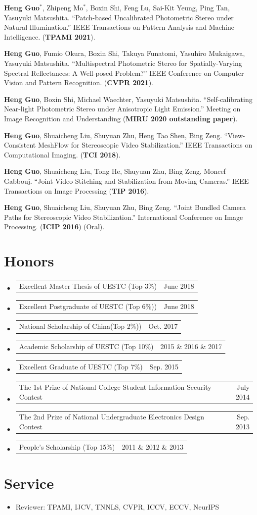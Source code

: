 \documentclass[UTF8]{ctexart}
\makeatletter
\newcommand{\resumeProjectHeading}[2]{
    \item
    \begin{tabular*}{0.97\textwidth}{l@{\extracolsep{\fill}}r}
      \small#1 & #2 \\
    \end{tabular*}\vspace{-7pt}
}
\newcommand{\resumeSubHeadingListStart}{\begin{itemize}[leftmargin=0.15in, label={}]}
\newcommand{\resumeSubHeadingListEnd}{\end{itemize}}
\makeatother
\begin{document}
\begin{enumerate}[label={[\arabic*]}]
	\item \textbf{Heng Guo$^*$}, Zhipeng Mo$^*$, Boxin Shi, Feng Lu, Sai-Kit Yeung, Ping Tan, Yasuyuki Matsushita. ``Patch-based Uncalibrated Photometric Stereo under Natural Illumination.'' 
	IEEE Transactions on Pattern Analysis and Machine Intelligence. (\textbf{TPAMI 2021}). 
	\item \textbf{Heng Guo}, Fumio Okura, Boxin Shi, Takuya Funatomi, Yasuhiro Mukaigawa, Yasuyuki Matsushita. ``Multispectral Photometric Stereo for Spatially-Varying Spectral Reflectances: A Well-posed Problem?'' IEEE Conference on Computer Vision and Pattern Recognition. (\textbf{CVPR 2021}). 
	\item \textbf{Heng Guo}, Boxin Shi, Michael Waechter, Yasuyuki Matsushita. ``Self-calibrating Near-light Photometric Stereo under Anisotropic Light Emission.'' Meeting on Image Recognition and Understanding (\textbf{MIRU 2020 outstanding paper}).  
	\item \textbf{Heng Guo}, Shuaicheng Liu, Shuyuan Zhu, Heng Tao Shen, Bing Zeng. ``View-Consistent MeshFlow for Stereoscopic Video Stabilization.'' IEEE Transactions on Computational Imaging. (\textbf{TCI 2018}).
	\item \textbf{Heng Guo}, Shuaicheng Liu, Tong He, Shuyuan Zhu, Bing Zeng, Moncef Gabbouj. ``Joint Video Stitching and Stabilization from Moving Cameras.'' IEEE Transactions on Image Processing (\textbf{TIP 2016}).
	\item \textbf{Heng Guo}, Shuaicheng Liu, Shuyuan Zhu, Bing Zeng. ``Joint Bundled Camera Paths for Stereoscopic Video Stabilization.'' International Conference on Image Processing. (\textbf{ICIP 2016}) (Oral).
\end{enumerate}


\section{Honors}
\resumeSubHeadingListStart
\resumeProjectHeading
{Excellent Master Thesis of UESTC (Top 3\%)}{June 2018}

\resumeProjectHeading
{Excellent Postgraduate of UESTC (Top 6\%))}{June 2018}
\resumeProjectHeading
{National Scholarship of China(Top 2\%))}{Oct. 2017}
\resumeProjectHeading
{Academic Scholarship of UESTC (Top 10\%)}{2015 \& 2016 \& 2017}
\resumeProjectHeading
{Excellent Graduate of UESTC (Top 7\%)}{Sep. 2015}
\resumeProjectHeading
{The 1st Prize of National College Student Information Security Contest}{July 2014}
\resumeProjectHeading
{The 2nd Prize of National Undergraduate Electronics Design Contest}{Sep. 2013}
\resumeProjectHeading
{People's Scholarship (Top 15\%)}{2011 \& 2012 \& 2013}
\resumeSubHeadingListEnd


\section{Service}
\begin{itemize}[]
	\item Reviewer: TPAMI, IJCV, TNNLS, CVPR, ICCV, ECCV, NeurIPS 
\end{itemize}

\end{document}
